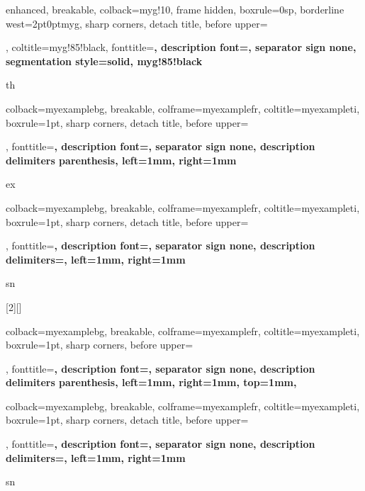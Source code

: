 {enhanced, breakable, colback=myg!10, frame hidden, boxrule=0sp, 
 borderline west={2pt}{0pt}{myg}, sharp corners, detach title, 
 before upper={\renewcommand{\familydefault}{\sfdefault}\selectfont\tcbtitle\par\smallskip}, 
 coltitle=myg!85!black, fonttitle=\bfseries\sffamily, description font=\mdseries, 
 separator sign none, segmentation style={solid, myg!85!black}}{th}

{colback=myexamplebg, breakable, colframe=myexamplefr, coltitle=myexampleti, 
 boxrule=1pt, sharp corners, detach title, 
 before upper={\renewcommand{\familydefault}{\sfdefault}\selectfont\tcbtitle\par\smallskip}, 
 fonttitle=\bfseries\sffamily, description font=\mdseries, 
 separator sign none, description delimiters parenthesis,
 left=1mm, %
 right=1mm %
}{ex}

{colback=myexamplebg, breakable, colframe=myexamplefr, coltitle=myexampleti, 
 boxrule=1pt, sharp corners, detach title, 
 before upper={\renewcommand{\familydefault}{\sfdefault}\selectfont\tcbtitle\par\smallskip}, 
 fonttitle=\bfseries\sffamily, description font=\mdseries, 
 separator sign none, description delimiters={}, %
 left=1mm, %
 right=1mm %
}{sn}


[2][]{%
    colback=myexamplebg, 
    breakable, 
    colframe=myexamplefr, 
    coltitle=myexampleti, 
    boxrule=1pt, 
    sharp corners, 
    before upper={\renewcommand{\familydefault}{\sfdefault}\selectfont\tcbtitle\par\smallskip}, 
    fonttitle=\bfseries\sffamily, 
    description font=\mdseries, 
    separator sign none, 
    description delimiters parenthesis, 
    left=1mm, %
    right=1mm, %
    top=1mm,
}

{colback=myexamplebg, breakable, colframe=myexamplefr, coltitle=myexampleti, 
 boxrule=1pt, sharp corners, detach title, 
 before upper={\renewcommand{\familydefault}{\sfdefault}\selectfont\tcbtitle\par\smallskip}, 
 fonttitle=\bfseries\sffamily, description font=\mdseries, 
 separator sign none, description delimiters={}, %
 left=1mm, %
 right=1mm %
}{sn}


